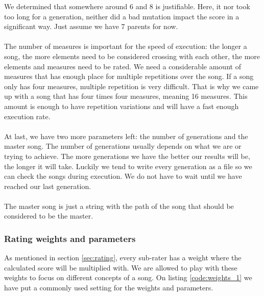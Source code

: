 \documentclass[a4paper]{article}
\begin{document}
We determined that somewhere around 6 and 8 is justifiable. Here, it nor took too long for a generation, neither did a bad mutation impact the score in a significant way. Just assume we have 7 parents for now.
\\\\
The number of measures is important for the speed of execution: the longer a song, the more elements need to be considered crossing with each other, the more elements and measures need to be rated. We need a considerable amount of measures that has enough place for multiple repetitions over the song. If a song only has four measures, multiple repetition is very difficult. That is why we came up with a song that has four times four measures, meaning 16 measures. This amount is enough to have repetition variations and will have a fast enough execution rate.
\\\\
At last, we have two more parameters left: the number of generations and the master song. The number of generations usually depends on what we are or trying to achieve. The more generations we have the better our results will be, the longer it will take. Luckily we tend to write every generation as a file so we can check the songs during execution. We do not have to wait until we have reached our last generation.
\\\\
The master song is just a string with the path of the song that should be considered to be the master.

\subsubsection{Rating weights and parameters}
As mentioned in section \ref{sec:rating}, every sub-rater has a weight where the calculated score will be multiplied with. We are allowed to play with these weights to focus on different concepts of a song. On listing \ref{code:weights_1} we have put a commonly used setting for the weights and parameters.
\end{document}
